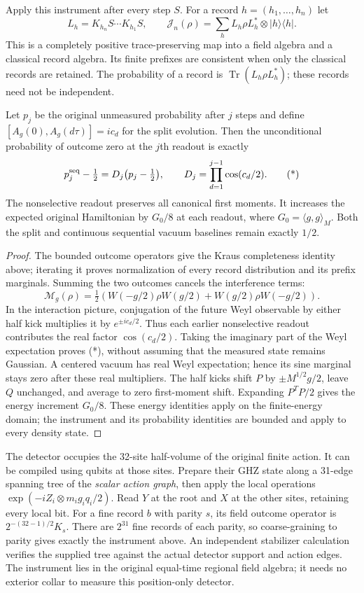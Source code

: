 \begin{theorem}
\label{thm:source-scalar-sequential-instrument}
Apply this instrument after every step $S$. For a record
$h=(h_1,\ldots,h_n)$ let
\[
 L_h=K_{h_n}S\cdots K_{h_1}S,\qquad
 \mathcal J_n(\rho)=\sum_h L_h\rho L_h^*\otimes|h\rangle\langle h|.
\]
This is a completely positive trace-preserving map into a field algebra
and a classical record algebra. Its finite prefixes are consistent when
only the classical records are retained. The probability of a record is
$\operatorname{Tr}(L_h\rho L_h^*)$; these records need not be independent.

Let $p_j$ be the original unmeasured probability after $j$ steps and define
$[A_g(0),A_g(d\tau)]=i c_d$ for the split evolution. Then the
unconditional probability of outcome zero at the $j$th readout is exactly
\[
 p_j^{\rm seq}-\tfrac12
 =D_j\bigl(p_j-\tfrac12\bigr),\qquad
 D_j=\prod_{d=1}^{j-1}\cos(c_d/2).                 \tag{*}
\]
The nonselective readout preserves all canonical first moments. It increases
the expected original Hamiltonian by $G_0/8$ at each readout, where
$G_0=\langle g,g\rangle_M$. Both the split and continuous sequential
vacuum baselines remain exactly $1/2$.
\end{theorem}
\begin{proof}
The bounded outcome operators give the Kraus completeness identity above;
iterating it proves normalization of every record distribution and its
prefix marginals. Summing the two outcomes cancels the interference terms:
\[
 \mathcal M_g(\rho)=\tfrac12\left(
 W(-g/2)\rho W(g/2)+W(g/2)\rho W(-g/2)\right).
\]
In the interaction picture, conjugation of the future Weyl observable by
either half kick multiplies it by $e^{\pm i c_d/2}$. Thus each earlier
nonselective readout contributes the real factor $\cos(c_d/2)$.
Taking the imaginary part of the Weyl expectation proves (*), without
assuming that the measured state remains Gaussian. A centered vacuum has
real Weyl expectation; hence its sine marginal stays zero after these
real multipliers. The half kicks shift $P$ by
$\pm M^{1/2}g/2$, leave $Q$ unchanged, and average to zero first-moment
shift. Expanding $P^TP/2$ gives the energy increment $G_0/8$.
These energy identities apply on the finite-energy domain; the instrument
and its probability identities are bounded and apply to every density state.
\end{proof}

The detector occupies the 32-site half-volume of the original finite
action. It can be compiled using qubits at those sites. Prepare their GHZ
state along a 31-edge spanning tree of the \emph{scalar action graph}, then
apply the local operations
$\exp(-iZ_i\otimes m_i g_i q_i/2)$. Read $Y$ at the root and $X$ at
the other sites, retaining every local bit. For a fine record $b$ with
parity $s$, its field outcome operator is
$2^{-(32-1)/2}K_s$. There are $2^{31}$ fine records of each parity, so
coarse-graining to parity gives exactly the instrument above.
An independent stabilizer calculation verifies the supplied tree against
the actual detector support and action edges. The instrument lies in the
original equal-time regional field algebra; it needs no exterior collar
to measure this position-only detector.

